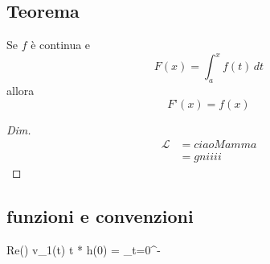\documentclass[a4paper, 12pt, italian]{book}
\begin{document}
\subsection*{Teorema}

Se $f$ è continua e
\begin{equation*}
F(x)=\int_a^x f(t)\,dt
\end{equation*}
allora
\begin{equation*}
F’(x)=f(x)
\end{equation*}


\begin{proof}[Dim]
	\begin{equation*}
	\begin{split}
	\mathscr{L} & = ciaoMamma \\
	& = gniiii
	\end{split}
	\end{equation*}
\end{proof}

\subsection*{funzioni e convenzioni}
Re() %
v_1(t) %
t\in{} %
* %
h(0) = \bigg\vert_{t=0^-} %
\end{document}

